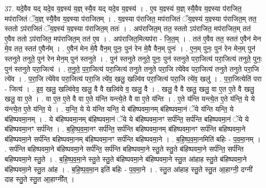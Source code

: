 \documentclass[17pt]{extarticle}
\begin{document}
37. यदे॒वैव यद् यदे॒व य॒ज्ञ्स्य॑ य॒ज्ञ् स्यै॒व यद् यदे॒व य॒ज्ञ्स्य॑ । . ए॒व य॒ज्ञ्स्य॑ य॒ज्ञ् स्यै॒वैव य॒ज्ञ्स्या प॑राजित॒ मप॑राजितं ॅय॒ज्ञ् स्यै॒वैव य॒ज्ञ्स्या प॑राजितम् । . य॒ज्ञ्स्या प॑राजित॒ मप॑राजितं ॅय॒ज्ञ्स्य॑ य॒ज्ञ्स्या प॑राजित॒म् तत॒ स्ततो ऽप॑राजितं ॅय॒ज्ञ्स्य॑ य॒ज्ञ्स्या प॑राजित॒म् ततः॑ । . अप॑राजित॒म् तत॒ स्ततो ऽप॑राजित॒ मप॑राजित॒म् तत॑ ए॒वैव ततो ऽप॑राजित॒ मप॑राजित॒म् तत॑ ए॒व । . अप॑राजित॒मित्यप॑रा - जि॒त॒म् । . तत॑ ए॒वैव तत॒ स्तत॑ ए॒वैन॑ मेन मे॒व तत॒ स्तत॑ ए॒वैन᳚म् । . ए॒वैन॑ मेन मे॒वै वैन॒म् पुनः॒ पुन॑ रेन मे॒वै वैन॒म् पुनः॑ । . ए॒न॒म् पुनः॒ पुन॑ रेन मेन॒म् पुन॑ स्तनुते तनुते॒ पुन॑ रेन मेन॒म् पुन॑ स्तनुते । . पुन॑ स्तनुते तनुते॒ पुनः॒ पुन॑ स्तनुते परा॒जित्य॑ परा॒जित्य॑ तनुते॒ पुनः॒ पुन॑ स्तनुते परा॒जित्य॑ । . त॒नु॒ते॒ प॒रा॒जित्य॑ परा॒जित्य॑ तनुते तनुते परा॒जि त्ये॑वेव परा॒जित्य॑ तनुते तनुते परा॒जि त्ये॑व । . प॒रा॒जि त्ये॑वेव परा॒जित्य॑ परा॒जि त्ये॑व॒ खलु॒ खल्वि॑व परा॒जित्य॑ परा॒जि त्ये॑व॒ खलु॑ । . प॒रा॒जित्येति॑ परा - जित्य॑ । . इ॒व॒ खलु॒ खल्वि॑वेव॒ खलु॒ वै वै खल्वि॑वे व॒ खलु॒ वै । . खलु॒ वै वै खलु॒ खलु॒ वा ए॒त ए॒ते वै खलु॒ खलु॒ वा ए॒ते । . वा ए॒त ए॒ते वै वा ए॒ते य॑न्ति यन्त्ये॒ते वै वा ए॒ते य॑न्ति । . ए॒ते य॑न्ति यन्त्ये॒त ए॒ते य॑न्ति॒ ये ये य॑न्त्ये॒त ए॒ते य॑न्ति॒ ये । . य॒न्ति॒ ये ये य॑न्ति यन्ति॒ ये ब॑हिष्पवमा॒नम् ब॑हिष्पवमा॒नं ॅये य॑न्ति यन्ति॒ ये ब॑हिष्पवमा॒नम् । . ये ब॑हिष्पवमा॒नम् ब॑हिष्पवमा॒नं ॅये ये ब॑हिष्पवमा॒नꣳ सर्प॑न्ति॒ सर्प॑न्ति बहिष्पवमा॒नं ॅये ये ब॑हिष्पवमा॒नꣳ सर्प॑न्ति । . ब॒हि॒ष्प॒व॒मा॒नꣳ सर्प॑न्ति॒ सर्प॑न्ति बहिष्पवमा॒नम् ब॑हिष्पवमा॒नꣳ सर्प॑न्ति बहिष्पवमा॒ने ब॑हिष्पवमा॒ने सर्प॑न्ति बहिष्पवमा॒नम् ब॑हिष्पवमा॒नꣳ सर्प॑न्ति बहिष्पवमा॒ने । . ब॒हि॒ष्प॒व॒मा॒नमिति॑ बहिः - प॒व॒मा॒नम् । . सर्प॑न्ति बहिष्पवमा॒ने ब॑हिष्पवमा॒ने सर्प॑न्ति॒ सर्प॑न्ति बहिष्पवमा॒ने स्तु॒ते स्तु॒ते ब॑हिष्पवमा॒ने सर्प॑न्ति॒ सर्प॑न्ति बहिष्पवमा॒ने स्तु॒ते । . ब॒हि॒ष्प॒व॒मा॒ने स्तु॒ते स्तु॒ते ब॑हिष्पवमा॒ने ब॑हिष्पवमा॒ने स्तु॒त आ॑हाह स्तु॒ते ब॑हिष्पवमा॒ने ब॑हिष्पवमा॒ने स्तु॒त आ॑ह । . ब॒हि॒ष्प॒व॒मा॒न इति॑ बहिः - प॒व॒मा॒ने । . स्तु॒त आ॑हाह स्तु॒ते स्तु॒त आ॒हाग्नी॒ दग्नी॑ दाह स्तु॒ते स्तु॒त आ॒हाग्नी᳚त् । \newline
\pagebreak
{}
\end{document}
